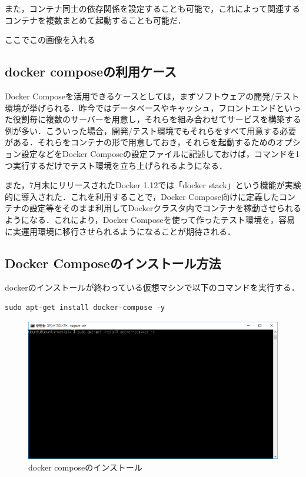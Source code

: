 また，コンテナ同士の依存関係を設定することも可能で，これによって関連するコンテナを複数まとめて起動することも可能だ．


ここでこの画像を入れる



\subsection{docker composeの利用ケース}
Docker Composeを活用できるケースとしては，まずソフトウェアの開発/テスト環境が挙げられる．昨今ではデータベースやキャッシュ，フロントエンドといった役割毎に複数のサーバーを用意し，それらを組み合わせてサービスを構築する例が多い．こういった場合，開発/テスト環境でもそれらをすべて用意する必要がある．それらをコンテナの形で用意しておき，それらを起動するためのオプション設定などをDocker Composeの設定ファイルに記述しておけば，コマンドを1つ実行するだけでテスト環境を立ち上げられるようになる．


また，7月末にリリースされたDocker 1.12では「docker stack」という機能が実験的に導入された．これを利用することで，Docker Compose向けに定義したコンテナの設定等をそのまま利用してDockerクラスタ内でコンテナを稼動させられるようになる．これにより，Docker Composeを使って作ったテスト環境を，容易に実運用環境に移行させられるようになることが期待される．




\newpage



\subsection{Docker Composeのインストール方法}

dockerのインストールが終わっている仮想マシンで以下のコマンドを実行する．


\begin{verbatim}
sudo apt-get install docker-compose -y
\end{verbatim}


\begin{figure}[h]
\centering
\includegraphics[width=12cm]{dockercomposeinstall.PNG}
\caption{docker composeのインストール}\label{サンプル図}
\end{figure}

